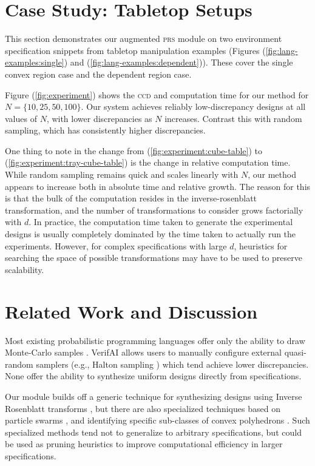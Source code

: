 \documentclass[sigplan, screen]{acmart} %
\begin{document}
\section{Case Study: Tabletop Setups}

This section demonstrates our augmented \textsc{prs} module on two environment specification snippets from tabletop manipulation examples (Figures (\ref{fig:lang-examples:single}) and (\ref{fig:lang-examples:dependent})). These cover the single convex region case and the dependent region case.

Figure (\ref{fig:experiment}) shows the \textsc{ccd} and computation time for our method for $N=\{10, 25, 50, 100\}$. Our system achieves reliably low-discrepancy designs at all values of $N$, with lower discrepancies as $N$ increases. Contrast this with random sampling, which has consistently higher discrepancies.

One thing to note in the change from (\ref{fig:experiment:cube-table}) to (\ref{fig:experiment:tray-cube-table}) is the change in relative computation time. While random sampling remains quick and scales linearly with $N$, our method appears to increase both in absolute time and relative growth. The reason for this is that the bulk of the computation resides in the inverse-rosenblatt transformation, and the number of transformations to consider grows factorially with $d$. In practice, the computation time taken to generate the experimental designs is usually completely dominated by the time taken to actually run the experiments. However, for complex specifications with large $d$, heuristics for searching the space of possible transformations may have to be used to preserve scalability.

\section{Related Work and Discussion}

Most existing probabilistic programming languages offer only the ability to draw Monte-Carlo samples \cite{fremont2018scenic, kulkarni2015picture, ritchiequicksand}. VerifAI \cite{dreossi2019verifai} allows users to manually configure external quasi-random samplers (e.g., Halton sampling \cite{niederreiter1992random}) which tend achieve lower discrepancies. None offer the ability to synthesize uniform designs directly from specifications.

Our module builds off a generic technique for synthesizing designs using Inverse Rosenblatt transforms \cite{zhang2020construction}, but there are also specialized techniques based on particle swarms \cite{chen2014central}, and identifying specific sub-classes of convex polyhedrons \cite{tian2009uniform}. Such specialized methods tend not to generalize to arbitrary specifications, but could be used as pruning heuristics to improve computational efficiency in larger specifications.
\end{document}
